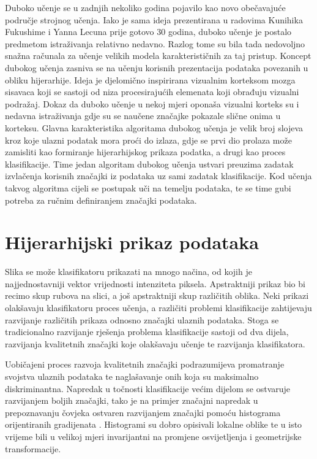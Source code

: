 \documentclass[lmodern, utf8, diplomski, numeric]{fer}
\begin{document}
Duboko učenje se u zadnjih nekoliko godina pojavilo kao novo obečavajuće područje strojnog učenja. Iako je sama ideja prezentirana u radovima Kunihika Fukushime \cite{fukushima1980deep} i Yanna Lecuna \cite{lecun1989zipcode} prije gotovo 30 godina, duboko učenje je postalo predmetom istraživanja relativno nedavno. Razlog tome su bila tada nedovoljno snažna računala za učenje velikih modela karakterističnih za taj pristup. Koncept dubokog učenja zasniva se na učenju korisnih prezentacija podataka povezanih u obliku hijerarhije. Ideja je djelomično inspirirana vizualnim korteksom mozga sisavaca koji se sastoji od niza procesirajućih elemenata koji obrađuju vizualni podražaj. Dokaz da duboko učenje u nekoj mjeri oponaša vizualni korteks su i nedavna istraživanja gdje su se naučene značajke pokazale slične onima u korteksu. Glavna karakteristika algoritama dubokog učenja je velik broj slojeva kroz koje ulazni podatak mora proći do izlaza, gdje se prvi dio prolaza može zamisliti kao formiranje hijerarhijskog prikaza podatka, a drugi kao proces klasifikacije. Time jedan algoritam dubokog učenja ustvari preuzima zadatak izvlačenja korisnih značajki iz podataka uz sami zadatak klasifikacije. Kod učenja takvog algoritma cijeli se postupak uči na temelju podataka, te se time gubi potreba za ručnim definiranjem značajki podataka. 

\section{Hijerarhijski prikaz podataka}

Slika se može klasifikatoru prikazati na mnogo načina, od kojih je najjednostavniji vektor vrijednosti intenziteta piksela. Apstraktniji prikaz bio bi recimo skup rubova na slici, a još apstraktniji skup različitih oblika. Neki prikazi olakšavaju klasifikatoru proces učenja, a različiti problemi klasifikacije zahtijevaju razvijanje različitih prikaza odnosno značajki ulaznih podataka. Stoga  se tradicionalno razvijanje rješenja problema klasifikacije sastoji od dva dijela, razvijanja kvalitetnih značajki koje olakšavaju učenje te razvijanja klasifikatora. 

Uobičajeni proces razvoja kvalitetnih značajki podrazumijeva promatranje svojstva ulaznih podataka te naglašavanje onih koja su maksimalno diskriminantna. Napredak u točnosti klasifikacije većim dijelom se ostvaruje razvijanjem boljih značajki, tako je na primjer značajni napredak u prepoznavanju čovjeka ostvaren razvijanjem značajki pomoću histograma orijentiranih gradijenata  \cite{dalal2005hog}. Histogrami su dobro opisivali lokalne oblike te u isto vrijeme bili u velikoj mjeri invarijantni na  promjene osvijetljenja i geometrijske transformacije. 
\end{document}
